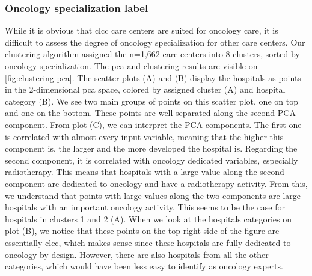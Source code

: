 \subsubsection{Oncology specialization label}

While it is obvious that \ac{clcc} care centers are suited for oncology care, it
is difficult to assess the degree of oncology specialization for other care
centers. Our clustering algorithm assigned the n=1,662 care centers into 8
clusters, sorted by oncology specialization. The \ac{pca} and clustering results
are visible on \cref{fig:clustering-pca}. The scatter plots (A) and (B) display
the hospitals as points in the 2-dimensional \ac{pca} space, colored by assigned
cluster (A) and hospital category (B). We see two main groups of points on this
scatter plot, one on top and one on the bottom. These points are well separated
along the second PCA component. From plot (C), we can interpret the PCA
components. The first one is correlated with almost every input variable,
meaning that the higher this component is, the larger and the more developed the
hospital is. Regarding the second component, it is correlated with oncology
dedicated variables, especially radiotherapy. This means that hospitals with a
large value along the second component are dedicated to oncology and have a
radiotherapy activity. From this, we understand that points with large values
along the two components are large hospitals with an important oncology
activity. This seems to be the case for hospitals in clusters 1 and 2 (A).
When we look at the hospitals categories on plot (B), we notice that these
points on the top right side of the figure are essentially \ac{clcc}, which
makes sense since these hospitals are fully dedicated to oncology by design.
However, there are also hospitals from all the other categories, which would
have been less easy to identify as oncology experts.

